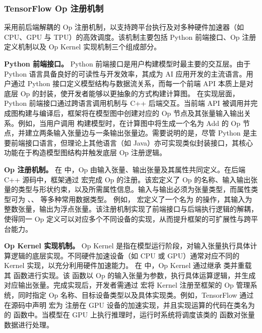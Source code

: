 \subsubsection{TensorFlow Op 注册机制}
 采用前后端解耦的 Op 注册机制，以支持跨平台执行及对多种硬件加速器（如 CPU、GPU 与 TPU）的高效调度。该机制主要包括 Python 前端接口、Op 注册定义机制以及 Op Kernel 实现机制三个组成部分。

\textbf{Python 前端接口。}
Python 前端接口是用户构建模型时最主要的交互层。由于 Python 语言具备良好的可读性与开发效率，其成为 AI 应用开发的主流语言。用户通过 Python 接口定义模型结构与数据流关系，而每一个前端 API 本质上是对底层 Op 的封装，使开发者能够以更抽象的方式构建计算图。
在实现层面，Python 前端接口通过跨语言调用机制与 C++ 后端交互。当前端 API 被调用并完成图构建与编译后，框架将在模型图中创建对应的 Op 节点及其张量输入输出关系。例如，当用户调用  构建模型时，在计算图中将生成一个名为 Add 的 Op 节点，并建立两条输入张量边与一条输出张量边。需要说明的是，尽管 Python 是主要前端接口语言，但理论上其他语言（如 Java）亦可实现类似封装接口，其核心功能在于构造模型图结构并触发底层 Op 注册逻辑。

\textbf{Op 注册机制。}
在  中，Op 由输入张量、输出张量及其属性共同定义。在后端 C++ 源码中，框架通过  宏完成 Op 的注册。该宏定义了 Op 的名称、输入输出张量的类型与形状约束，以及所需属性信息。输入与输出必须为张量类型，而属性类型可为 、、 等多种常用数据类型。
例如， 宏定义了一个名为  的操作，其输入为整数张量，输出为浮点张量。该注册机制实现了前端接口与后端执行逻辑的解耦，使得同一 Op 定义可以对应多个不同设备的实现，从而提升框架的可扩展性与跨平台能力。

\textbf{Op Kernel 实现机制。}
Op Kernel 是指在模型运行阶段，对输入张量执行具体计算逻辑的底层实现。不同硬件加速设备（如 CPU 或 GPU）通常对应不同的 Kernel 实现，以充分利用硬件加速能力。
在  中，Op Kernel 通过继承  类并重载其  函数进行实现。该  函数以 Op 的输入张量为参数，执行具体运算逻辑，并生成对应输出张量。完成实现后，开发者需通过  宏将 Kernel 注册至框架的 Op 管理系统，同时指定 Op 名称、目标设备类型以及具体实现类。例如，TensorFlow 通过在源码中声明  宏为  注册在 GPU 设备的加速实现，并且实现运算的代码在类名为  的  函数中。当模型在 GPU 上执行推理时，运行时系统将调度该类的  函数对张量数据进行处理。

